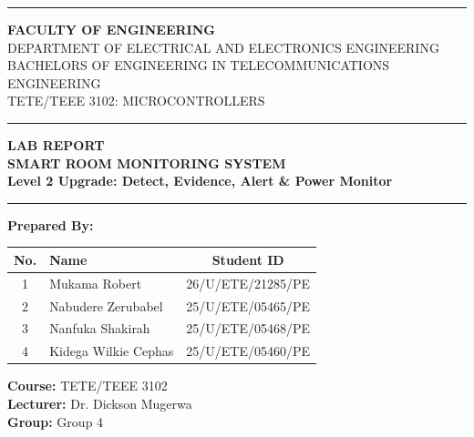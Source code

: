 \documentclass[12pt,a4paper]{article}
\begin{document}
\begin{titlepage}
    \centering
    
    \rule{3cm}{3cm} %
    \vspace{1cm}
    
    {\Large \textbf{FACULTY OF ENGINEERING}}\\[0.2cm]
    {\large DEPARTMENT OF ELECTRICAL AND ELECTRONICS ENGINEERING}\\[0.2cm]
    {\large BACHELORS OF ENGINEERING IN TELECOMMUNICATIONS ENGINEERING}\\[0.5cm]
    
    {\large TETE/TEEE 3102: MICROCONTROLLERS}\\[1cm]
    
    \hrule
    \vspace{0.5cm}
    {\huge \textbf{LAB REPORT}}\\[0.3cm]
    {\LARGE \textbf{SMART ROOM MONITORING SYSTEM}}\\[0.2cm]
    {\Large \textbf{Level 2 Upgrade: Detect, Evidence, Alert \& Power Monitor}}
    \vspace{0.5cm}
    \hrule
    \vspace{1.5cm}
    
    {\Large \textbf{Prepared By:}}
    \vspace{0.5cm}
    
    \begin{center}
        \renewcommand{\arraystretch}{1.2}
        \begin{tabular}{|c|l|c|}
            \hline
            \textbf{No.} & \textbf{Name} & \textbf{Student ID} \\
            \hline
            1 & Mukama Robert & 26/U/ETE/21285/PE \\
            2 & Nabudere Zerubabel & 25/U/ETE/05465/PE \\
            3 & Nanfuka Shakirah & 25/U/ETE/05468/PE \\
            4 & Kidega Wilkie Cephas & 25/U/ETE/05460/PE \\
            \hline
        \end{tabular}
    \end{center}
    
    \vfill
    
    \begin{flushleft}
        \textbf{Course:} TETE/TEEE 3102 \\
        \textbf{Lecturer:} Dr. Dickson Mugerwa \\
        \textbf{Group:} Group 4
    \end{flushleft}
    

\end{titlepage}
\end{document}
